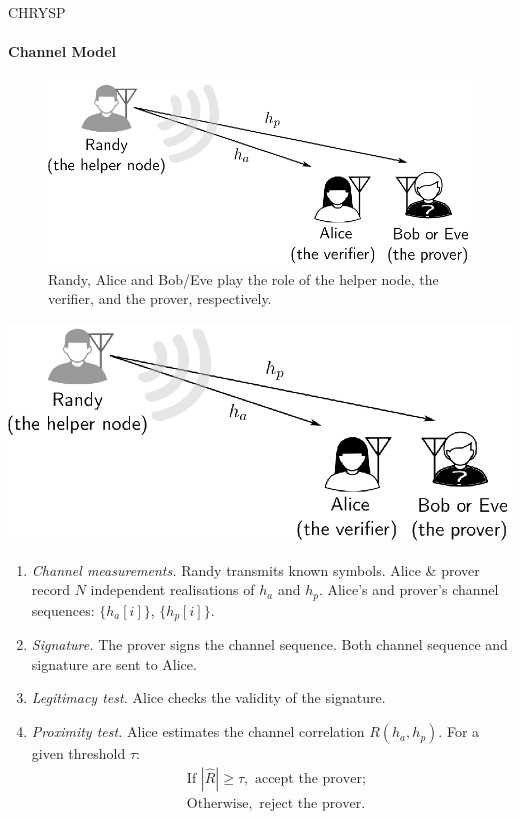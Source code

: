 \begin{frame}{CHRYSP}
\framesubtitle{Channel Model}
\begin{figure}
    \centering    \includegraphics{figures/against_distance_fraud/RandyAliceChannelmodel.eps}
    
    \caption{Randy, Alice and Bob/Eve play the role of the helper node, the verifier, and the prover, respectively.}
\end{figure}
\end{frame}
\begin{frame}
\centering
\includegraphics[width=0.6\linewidth]{figures/against_distance_fraud/RandyAliceChannelmodel.eps}

\begin{enumerate}
\item<1-> \textit{Channel measurements.}
Randy transmits known symbols. 
Alice \& prover record $N$ independent realisations of $h_a$ and $h_p$. Alice's and prover's channel sequences: $\{h_a[i]\}$, $\{h_p[i]\}$.

\item<2-> \textit{Signature.} The prover signs the channel sequence. Both channel sequence and signature are sent to Alice.


\item<3-> \textit{Legitimacy test.} Alice checks the validity of the signature.

\item<4-> \textit{Proximity test.} Alice estimates the channel correlation  $R(h_a, h_p)$. For a given threshold $\tau$:
\begin{align}
    &\text{If } |\hat{R}|\geq \tau, \text{ accept the prover}; \nonumber\\
    &\text{Otherwise}, \text{ reject the prover}.\nonumber
\end{align}
\end{enumerate}
\end{frame}

